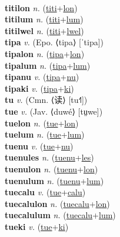  \label{titi} \\
\textbf{titilon} \textit{n.} (\hyperref[titi]{titi}+\hyperref[lon]{lon})
 \label{titilon} \\
\textbf{titilum} \textit{n.} (\hyperref[titi]{titi}+\hyperref[lum]{lum})
 \label{titilum} \\
\textbf{titilwel} \textit{n.} (\hyperref[titi]{titi}+\hyperref[lwel]{lwel})
 \label{titilwel} \\
\textbf{tipa} \textit{v.} (Epo. ⟨tipa⟩ [ˈtipa])
 \label{tipa} \\
\textbf{tipalon} \textit{n.} (\hyperref[tipa]{tipa}+\hyperref[lon]{lon})
 \label{tipalon} \\
\textbf{tipalum} \textit{n.} (\hyperref[tipa]{tipa}+\hyperref[lum]{lum})
 \label{tipalum} \\
\textbf{tipanu} \textit{v.} (\hyperref[tipa]{tipa}+\hyperref[nu]{nu})
 \label{tipanu} \\
\textbf{tipaki} \textit{v.} (\hyperref[tipa]{tipa}+\hyperref[ki]{ki})
 \label{tipaki} \\
\textbf{tu} \textit{v.} (Cmn. ⟨读⟩ [tu˧˥])
 \label{tu} \\
\textbf{tue} \textit{v.} (Jav. ⟨duwé⟩ [tṳwe])
 \label{tue} \\
\textbf{tuelon} \textit{n.} (\hyperref[tue]{tue}+\hyperref[lon]{lon})
 \label{tuelon} \\
\textbf{tuelum} \textit{n.} (\hyperref[tue]{tue}+\hyperref[lum]{lum})
 \label{tuelum} \\
\textbf{tuenu} \textit{v.} (\hyperref[tue]{tue}+\hyperref[nu]{nu})
 \label{tuenu} \\
\textbf{tuenules} \textit{n.} (\hyperref[tuenu]{tuenu}+\hyperref[les]{les})
 \label{tuenules} \\
\textbf{tuenulon} \textit{n.} (\hyperref[tuenu]{tuenu}+\hyperref[lon]{lon})
 \label{tuenulon} \\
\textbf{tuenulum} \textit{n.} (\hyperref[tuenu]{tuenu}+\hyperref[lum]{lum})
 \label{tuenulum} \\
\textbf{tuecalu} \textit{v.} (\hyperref[tue]{tue}+\hyperref[calu]{calu})
 \label{tuecalu} \\
\textbf{tuecalulon} \textit{n.} (\hyperref[tuecalu]{tuecalu}+\hyperref[lon]{lon})
 \label{tuecalulon} \\
\textbf{tuecalulum} \textit{n.} (\hyperref[tuecalu]{tuecalu}+\hyperref[lum]{lum})
 \label{tuecalulum} \\
\textbf{tueki} \textit{v.} (\hyperref[tue]{tue}+\hyperref[ki]{ki})
 \label{tueki} \\
